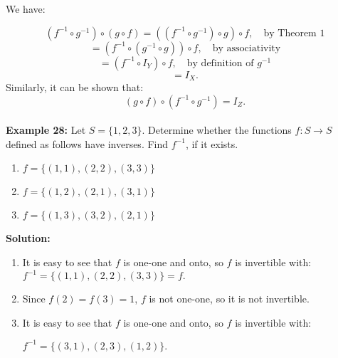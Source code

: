 \documentclass[12pt]{article}
\begin{document}
We have:

\[
(f^{-1} \circ g^{-1}) \circ (g \circ f) = ((f^{-1} \circ g^{-1}) \circ g) \circ f, \quad \text{by Theorem 1}
\]
\[
= (f^{-1} \circ (g^{-1} \circ g)) \circ f, \quad \text{by associativity}
\]
\[
= (f^{-1} \circ I_Y) \circ f, \quad \text{by definition of } g^{-1}
\]
\[
= I_X.
\]
Similarly, it can be shown that:\[(g \circ f) \circ (f^{-1} \circ g^{-1}) = I_Z.\]
\\
\textbf{Example 28:}  
Let \( S = \{1, 2, 3\} \). Determine whether the functions \( f: S \to S \) defined as follows have inverses. Find \( f^{-1} \), if it exists.
\\
\begin{enumerate}
    \renewcommand{\labelenumi}{\alph{enumi})}
    \item \( f = \{(1,1), (2,2), (3,3)\} \)
    \item \( f = \{(1,2), (2,1), (3,1)\} \)
    \item \( f = \{(1,3), (3,2), (2,1)\} \)
\end{enumerate}


\textbf{Solution:}

\begin{enumerate}
    \renewcommand{\labelenumi}{\alph{enumi})}

    \item It is easy to see that \( f \) is one-one and onto, so \( f \) is invertible with: \(
    f^{-1} = \{(1,1), (2,2), (3,3)\} = f.
    \)

    \item Since \( f(2) = f(3) = 1 \), \( f \) is not one-one, so it is not invertible.

    \item It is easy to see that \( f \) is one-one and onto, so \( f \) is invertible with:

    \(
    f^{-1} = \{(3,1), (2,3), (1,2)\}.
    \)
\end{enumerate}
\end{document}

